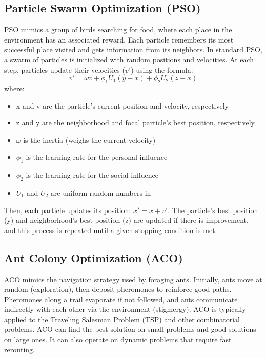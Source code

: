 \subsection*{Particle Swarm Optimization (PSO)}
PSO mimics a group of birds searching for food, where each place in the environment has an associated reward.  Each particle remembers its most successful place visited and gets information from its neighbors. In standard PSO, a swarm of particles is initialized with random positions and velocities. At each step, particles update their velocities ($v'$) using the formula:
$$v' = \omega v + \phi_1 U_1(y - x) + \phi_2 U_2(z-x)$$
where:
\begin{itemize}
    \item x and v are the particle’s current position and velocity, respectively
    \item z and y are the neighborhood and focal particle’s best position, respectively
    \item $\omega$ is the inertia (weighs the current velocity)
    \item $\phi_1$ is the learning rate for the personal influence
    \item  $\phi_2$ is the learning rate for the social influence
    \item $U_1$ and $U_2$ are uniform random numbers in
\end{itemize}
Then, each particle updates its position: $x' = x + v'$. The particle's best position (y) and neighborhood's best position (z) are updated if there is improvement, and this process is repeated until a given stopping condition is met.

\subsection*{Ant Colony Optimization (ACO)}
ACO mimics the navigation strategy used by foraging ants. Initially, ants move at random (exploration), then deposit pheromones to reinforce good paths. Pheromones along a trail evaporate if not followed, and ants communicate indirectly with each other via the environment (stigmergy). ACO is typically applied to the Traveling Salesman Problem (TSP) and other combinatorial problems. ACO can find the best solution on small problems and good solutions on large ones. It can also operate on dynamic problems that require fast rerouting.

